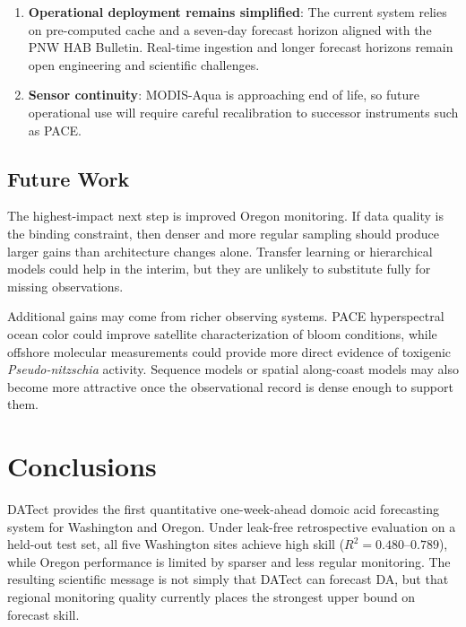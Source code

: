 \documentclass[toxins,article,submit,moreauthors]{Definitions/mdpi}
\begin{document}
\begin{enumerate}[nosep]
    \item \textbf{Operational deployment remains simplified}: The current system relies on pre-computed cache and a seven-day forecast horizon aligned with the PNW HAB Bulletin. Real-time ingestion and longer forecast horizons remain open engineering and scientific challenges.
    \item \textbf{Sensor continuity}: MODIS-Aqua is approaching end of life, so future operational use will require careful recalibration to successor instruments such as PACE.
\end{enumerate}

\subsection{Future Work}
\label{sec:discussion-future}

The highest-impact next step is improved Oregon monitoring. If data quality is the binding constraint, then denser and more regular sampling should produce larger gains than architecture changes alone. Transfer learning or hierarchical models could help in the interim, but they are unlikely to substitute fully for missing observations.

Additional gains may come from richer observing systems. PACE hyperspectral ocean color \cite{Werdell2019} could improve satellite characterization of bloom conditions, while offshore molecular measurements \cite{Brunson2024} could provide more direct evidence of toxigenic \textit{Pseudo-nitzschia} activity. Sequence models or spatial along-coast models may also become more attractive once the observational record is dense enough to support them.


\section{Conclusions}
\label{sec:conclusions}

DATect provides the first quantitative one-week-ahead domoic acid forecasting system for Washington and Oregon. Under leak-free retrospective evaluation on a held-out test set, all five Washington sites achieve high skill ($R^2 = 0.480$--$0.789$), while Oregon performance is limited by sparser and less regular monitoring. The resulting scientific message is not simply that DATect can forecast DA, but that regional monitoring quality currently places the strongest upper bound on forecast skill.
\end{document}
